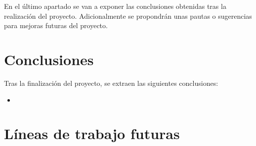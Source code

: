 
En el último apartado se van a exponer las conclusiones obtenidas tras la realización del proyecto. Adicionalmente se propondrán unas pautas o sugerencias para mejoras futuras  del proyecto.

\section{Conclusiones}\label{conclusiones}

Tras la finalización del proyecto, se extraen las siguientes conclusiones:

\begin{itemize}
\item


\end{itemize}



\section{Líneas de trabajo futuras}\label{lineas_de_trabajo_futuras}

